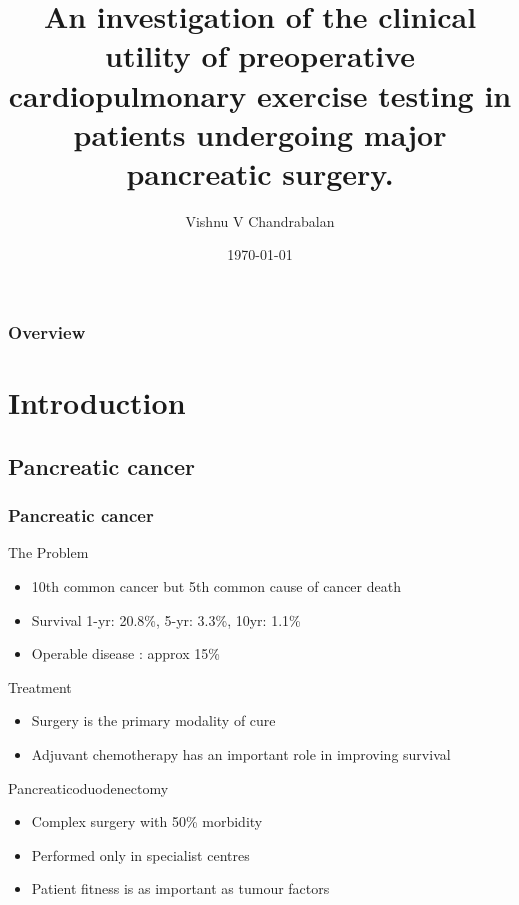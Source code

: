 \documentclass{beamer}
\title[Improving Outcomes in Pancreatic Surgery]{An investigation of the clinical utility of preoperative cardiopulmonary exercise testing in patients undergoing major pancreatic surgery.} %
\author{Vishnu V Chandrabalan} %
\institute[UoG] %
{
University of Glasgow \\ %
\medskip
}
\date{\today} %
\begin{document}
\begin{frame}
\titlepage %
\end{frame}

\begin{frame}
\frametitle{Overview} %
\tableofcontents %
\end{frame}


\section{Introduction}
\subsection{Pancreatic cancer}
\begin{frame}
	\frametitle{Pancreatic cancer} %
	\begin{block}{The Problem}
		\begin{itemize}
			\item 10th common cancer but 5th common cause of cancer death
			\item Survival	1-yr: 20.8\%, 5-yr: 3.3\%, 10yr: 1.1\%
			\item Operable disease : approx 15\%
		\end{itemize}
	\end{block}
	\begin{block}{Treatment}
		\begin{itemize}
			\item Surgery is the primary modality of cure
			\item Adjuvant chemotherapy has an important role in improving survival
		\end{itemize}
	\end{block}
	\begin{block}{Pancreaticoduodenectomy}
		\begin{itemize}
			\item Complex surgery with 50\% morbidity
			\item Performed only in specialist centres
			\item Patient fitness is as important as tumour factors
		\end{itemize}
	\end{block}
\end{frame}
\end{document}
